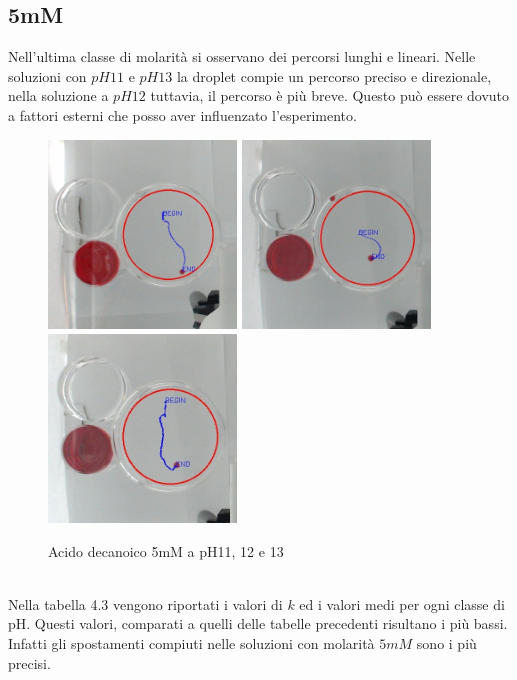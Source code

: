 \subsection{5mM}
Nell'ultima classe di molarità si osservano dei percorsi lunghi e lineari. Nelle soluzioni con $pH11$ e $pH13$ la droplet compie un percorso preciso e direzionale, nella soluzione a $pH12$ tuttavia, il percorso è più breve. Questo può essere dovuto a fattori esterni che posso aver influenzato l'esperimento.
\begin{figure}[h]
	\centering
   		{\includegraphics[width=5cm]{immagini/5mMpH11-1.jpg}} %
 	\hspace{2mm}   	
		{\includegraphics[width=5cm]{immagini/5mMpH11-2.jpg}}%
	\hspace{2mm}   	
		{\includegraphics[width=5cm]{immagini/5mMpH13-2.jpg}}%
	\caption{Acido decanoico 5mM a pH11, 12 e 13}
\end{figure}
\\Nella tabella 4.3 vengono riportati i valori di $k$ ed i valori medi per ogni classe di pH. Questi valori, comparati a quelli delle tabelle precedenti risultano i più bassi. Infatti gli spostamenti compiuti nelle soluzioni con molarità $5mM$ sono i più precisi.
